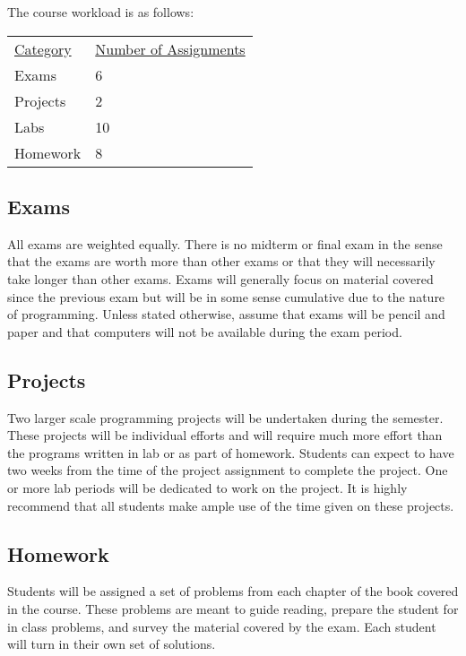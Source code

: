 \documentclass[10pt]{article}
\begin{document}
The course workload is as follows:
\begin{center}
  \begin{tabular}{ll}
    \underline{Category} & \underline{Number of Assignments} \\
    Exams & 6 \\
    Projects & 2 \\
    Labs & 10 \\
    Homework & 8
  \end{tabular}
\end{center}

\subsection*{Exams}

All exams are weighted equally. There is no midterm or final exam in the sense that the exams are worth more than other exams or that they will necessarily take longer than other exams.  Exams will generally focus on material covered since the previous exam but will be in some sense cumulative due to the nature of programming. Unless stated otherwise, assume that exams will be pencil and paper and that computers will not be available during the exam period.

\subsection*{Projects}

Two larger scale programming projects will be undertaken during the semester. These projects will be individual efforts and will require much more effort than the programs written in lab or as part of homework. Students can expect to have two weeks from the time of the project assignment to complete the project. One or more lab periods will be dedicated to work on the project. It is highly recommend that all students make ample use of the time given on these projects.

\subsection*{Homework}

Students will be assigned a set of problems from each chapter of the book covered in the course. These problems are meant to guide reading, prepare the student for in class problems, and survey the material covered by the exam. Each student will turn in their own set of solutions.
\end{document}
